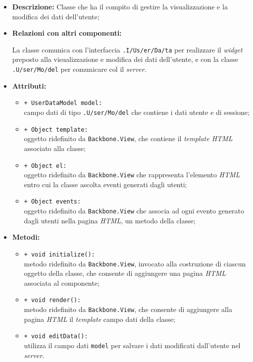 \begin{flushleft}
\begin{itemize}
\item \textbf{Descrizione:} Classe che ha il compito di gestire la visualizzazione e la modifica dei dati dell'utente;
\item \textbf{Relazioni con altri componenti:}
\begin{sloppypar}
La classe comunica con l'interfaccia \texttt{\viewUser{}.I\fshyp{}Us\fshyp{}er\fshyp{}Da\fshyp{}ta} per realizzare il \textit{widget} preposto alla visualizzazione e modifica dei dati dell'utente, e con la classe \texttt{\model{}.U\fshyp{}ser\fshyp{}Mo\fshyp{}del} per comunicare col il \textit{server}.
\end{sloppypar}
\item \textbf{Attributi:}
\begin{sloppypar}
\begin{itemize}
\item \texttt{+ UserDataModel model:}\\ campo dati di tipo \texttt{\model{}.U\fshyp{}ser\fshyp{}Mo\fshyp{}del} che contiene i dati utente e di sessione;
\item \texttt{+ Object template:}\\ oggetto ridefinito da \texttt{Backbone.View}, che contiene il \textit{template HTML} associato alla classe;
\item \texttt{+ Object el:}\\ oggetto ridefinito da \texttt{Backbone.View} che rappresenta l'elemento \textit{HTML} entro cui la classe ascolta eventi generati dagli utenti;
\item \texttt{+ Object events:}\\ oggetto ridefinito da \texttt{Backbone.View} che associa ad ogni evento generato dagli utenti nella pagina \textit{HTML}, un metodo della classe;
\end{itemize}
\end{sloppypar}
\item \textbf{Metodi:}
\begin{sloppypar}
\begin{itemize}
\item \texttt{+ void initialize():}\\ metodo ridefinito da \texttt{Backbone.View}, invocato alla costruzione di ciascun oggetto della classe, che consente di aggiungere una pagina \textit{HTML} associata al componente;
\item \texttt{+ void render():}\\ metodo ridefinito da \texttt{Backbone.View}, che consente di aggiungere alla pagina \textit{HTML} il \textit{template} campo dati della classe;
\item \texttt{+ void editData():}\\ utilizza il campo dati \texttt{model} per salvare i dati modificati dall'utente nel \textit{server}.
\end{itemize}
\end{sloppypar}
\end{itemize}
\end{flushleft}

